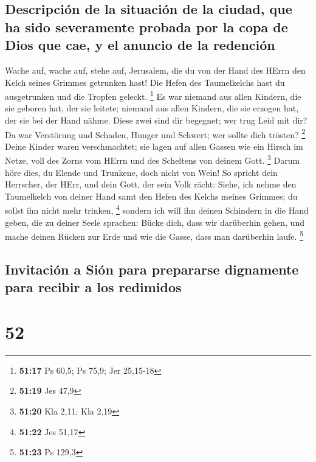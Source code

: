 \hypertarget{descripciuxf3n-de-la-situaciuxf3n-de-la-ciudad-que-ha-sido-severamente-probada-por-la-copa-de-dios-que-cae-y-el-anuncio-de-la-redenciuxf3n}{%
\subsection{Descripción de la situación de la ciudad, que ha sido
severamente probada por la copa de Dios que cae, y el anuncio de la
redención}\label{descripciuxf3n-de-la-situaciuxf3n-de-la-ciudad-que-ha-sido-severamente-probada-por-la-copa-de-dios-que-cae-y-el-anuncio-de-la-redenciuxf3n}}

 Wache auf, wache auf, stehe auf, Jerusalem, die du von
der Hand des HErrn den Kelch seines Grimmes getrunken hast! Die Hefen
des Taumelkelchs hast du ausgetrunken und die Tropfen geleckt.
\footnote{\textbf{51:17} Ps 60,5; Ps 75,9; Jer 25,15-18} 
Es war niemand aus allen Kindern, die sie geboren hat, der sie leitete;
niemand aus allen Kindern, die sie erzogen hat, der sie bei der Hand
nähme.  Diese zwei sind dir begegnet; wer trug Leid mit
dir? Da war Verstörung und Schaden, Hunger und Schwert; wer sollte dich
trösten? \footnote{\textbf{51:19} Jes 47,9}  Deine Kinder
waren verschmachtet; sie lagen auf allen Gassen wie ein Hirsch im Netze,
voll des Zorns vom HErrn und des Scheltens von deinem Gott. \footnote{\textbf{51:20}
  Kla 2,11; Kla 2,19}  Darum höre dies, du Elende und
Trunkene, doch nicht von Wein!  So spricht dein
Herrscher, der HErr, und dein Gott, der sein Volk rächt: Siehe, ich
nehme den Taumelkelch von deiner Hand samt den Hefen des Kelchs meines
Grimmes; du sollst ihn nicht mehr trinken, \footnote{\textbf{51:22} Jes
  51,17}  sondern ich will ihn deinen Schindern in die
Hand geben, die zu deiner Seele sprachen: Bücke dich, dass wir
darüberhin gehen, und mache deinen Rücken zur Erde und wie die Gasse,
dass man darüberhin laufe. \footnote{\textbf{51:23} Ps 129,3}

\hypertarget{invitaciuxf3n-a-siuxf3n-para-prepararse-dignamente-para-recibir-a-los-redimidos}{%
\subsection{Invitación a Sión para prepararse dignamente para recibir a
los
redimidos}\label{invitaciuxf3n-a-siuxf3n-para-prepararse-dignamente-para-recibir-a-los-redimidos}}

\hypertarget{section-51}{%
\section{52}\label{section-51}}

